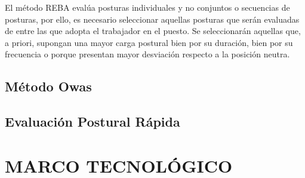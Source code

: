 El método REBA evalúa posturas individuales y no conjuntos o secuencias de posturas, por ello, es necesario seleccionar aquellas posturas que serán evaluadas de entre las que adopta el trabajador en el puesto. Se seleccionarán aquellas que, a priori, supongan una mayor carga postural bien por su duración, bien por su frecuencia o porque presentan mayor desviación respecto a la posición neutra.
\subsection{Método Owas}
\subsection{Evaluación Postural Rápida}
\subsubsection{}
\section{MARCO TECNOLÓGICO}